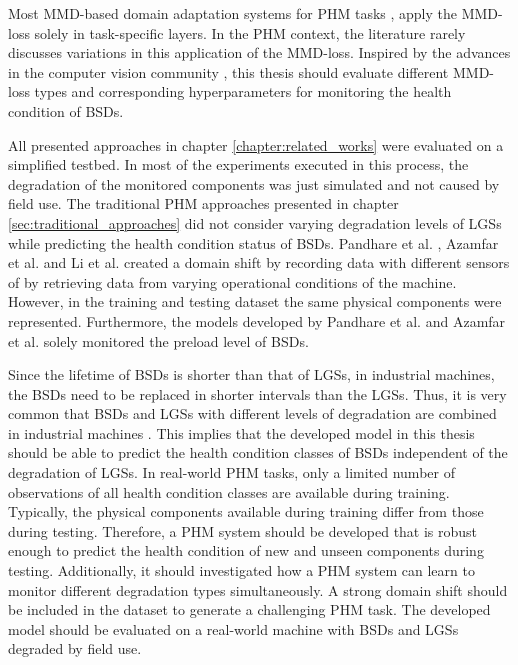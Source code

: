 Most MMD-based domain adaptation systems for PHM tasks \cite{Pandhare2021} \cite{AZAMFAR2020103932} \cite{Li2018}, apply the MMD-loss solely in task-specific layers. In the PHM context, the literature rarely discusses variations in this application of the MMD-loss. Inspired by the advances in the computer vision community \cite{li2020} \cite{Aljundi2016}, this thesis should evaluate different MMD-loss types and corresponding hyperparameters for monitoring the health condition of BSDs.

All presented approaches in chapter \ref{chapter:related_works} were evaluated on a simplified testbed. In most of the experiments executed in this process, the degradation of the monitored components was just simulated and not caused by field use. The traditional PHM approaches presented in chapter \ref{sec:traditional_approaches} did not consider varying degradation levels of LGSs while predicting the health condition status of BSDs. Pandhare et al. \cite{Pandhare2021}, Azamfar et al. \cite{AZAMFAR2020103932} and Li et al. \cite{Li2018} created a domain shift by recording data with different sensors of by retrieving data from varying operational conditions of the machine. However, in the training and testing dataset the same physical components were represented. Furthermore, the models developed by Pandhare et al. \cite{Pandhare2021} and Azamfar et al. \cite{AZAMFAR2020103932} solely monitored the preload level of BSDs.

Since the lifetime of BSDs is shorter than that of LGSs, in industrial machines, the BSDs need to be replaced in shorter intervals than the LGSs. Thus, it is very common that BSDs and LGSs with different levels of degradation are combined in industrial machines \cite{Li2018}. This implies that the developed model in this thesis should be able to predict the health condition classes of BSDs independent of the degradation of LGSs. In real-world PHM tasks, only a limited number of observations of all health condition classes are available during training. Typically, the physical components available during training differ from those during testing. Therefore, a PHM system should be developed that is robust enough to predict the health condition of new and unseen components during testing. Additionally, it should investigated how a PHM system can learn to monitor different degradation types simultaneously. A strong domain shift should be included in the dataset to generate a challenging PHM task. The developed model should be evaluated on a real-world machine with BSDs and LGSs degraded by field use. 






